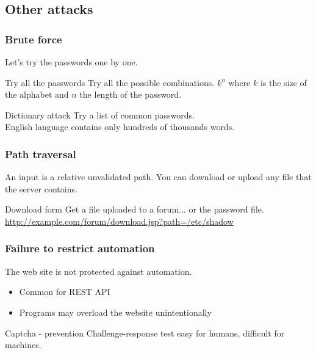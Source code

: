 \subsection{Other attacks}

\begin{frame}
\frametitle{Brute force}
Let's try the passwords one by one.
\begin{block}{Try all the passwords}
Try all the possible combinations.
\newline
$k^n$ where $k$ is the size of the alphabet and $n$ the length of the
password.
\end{block}
\begin{block}{Dictionary attack}
Try a list of common passwords.
\\ English language contains only hundreds of thousands words.
\end{block}
\end{frame}


\begin{frame}
\frametitle{Path traversal}
An input is a relative unvalidated path.
You can download or upload any file that the server contains.
\begin{exampleblock}{Download form}
Get a file uploaded to a forum... or the password file.
\newline
\url{http://example.com/forum/download.jsp?path=/etc/shadow}
\end{exampleblock}
\end{frame}

\begin{frame}
\frametitle{Failure to restrict automation}
The web site is not protected against automation.
\begin{itemize}
\item Common for REST API
\item Programs may overload the website unintentionally
\end{itemize}
\begin{exampleblock}{Captcha - prevention}
Challenge-response test easy for humans, difficult for machines.
\end{exampleblock}
\end{frame}

